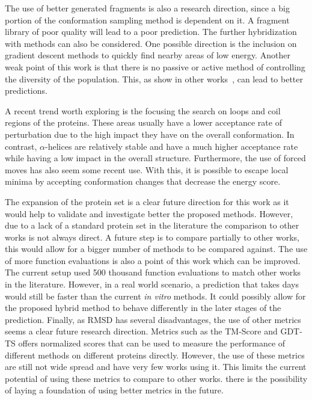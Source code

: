 The use of better generated fragments is also a research direction, since a big
portion of the conformation sampling method is dependent on it. A fragment
library of poor quality will lead to a poor prediction.
The further hybridization with methods can also be considered.  One possible
direction is the inclusion on gradient descent methods to quickly find nearby
areas of low energy.
Another weak point of this work is that there is no passive or active method of
controlling the diversity of the population. This, as show in other
works~\cite{narloch2016diversification,simoncini2017balancing}, can lead to
better predictions.

A recent trend worth exploring is the focusing the search on loops and coil
regions of the proteins. These areas usually have a lower acceptance rate of
perturbation due to the high impact they have on the overall conformation.  In
contrast, $\alpha$-helices are relatively stable and have a much higher
acceptance rate while having a low impact in the overall structure.
Furthermore, the use of forced moves has also seem some recent use. With this,
it is possible to escape local minima by accepting conformation changes that
decrease the energy score.

The expansion of the protein set is a clear future direction for this work as
it would help to validate and investigate better the proposed methods. However,
due to a lack of a standard protein set in the literature the comparison to
other works is not always direct.
A future step is to compare partially to other works, this would allow for a
bigger number of methods to be compared against.
The use of more function evaluations is also a point of this work which can be
improved. The current setup used 500 thousand function evaluations to match
other works in the literature. However, in a real world scenario, a prediction
that takes days would still be faster than the current \textit{in vitro}
methods. It could possibly allow for the proposed hybrid method to behave
differently in the later stages of the prediction.
Finally, as RMSD has several disadvantages, the use of other metrics seems a
clear future research direction. Metrics such as the TM-Score and GDT-TS offers
normalized scores that can be used to measure the performance of different
methods on different proteins directly.  However, the use of these metrics are
still not wide spread and have very few works using it. This limits the current
potential of using these metrics to compare to other works. %
there is the possibility of laying a foundation of using better metrics in the
future.
